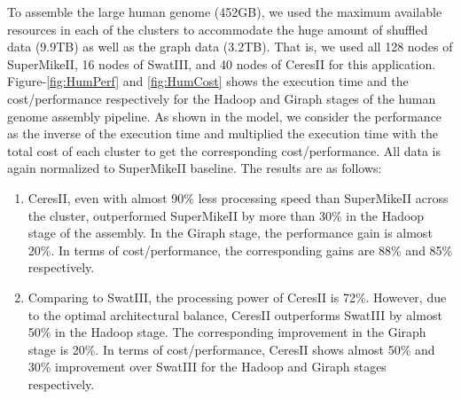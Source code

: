 \documentclass[journal]{IEEEtran}
\begin{document}
To assemble the large human genome (452GB), we used the maximum available resources in each of the clusters to accommodate the huge amount of shuffled data (9.9TB) as well as the graph data (3.2TB). That is, we used all 128 nodes of SuperMikeII, 16 nodes of SwatIII, and 40 nodes of CeresII for this application. Figure-\ref{fig:HumPerf} and \ref{fig:HumCost} shows the execution time and the cost/performance respectively for the Hadoop and Giraph stages of the human genome assembly pipeline. As shown in the model, we consider the performance as the inverse of the execution time and multiplied the execution time with the total cost of each cluster to get the corresponding cost/performance. All data is again normalized to SuperMikeII baseline. The results are as follows:
\begin{enumerate}
\item CeresII, even with almost 90\% less processing speed than SuperMikeII across the cluster, outperformed SuperMikeII by more than 30\% in the Hadoop stage of the assembly. In the Giraph stage, the performance gain is almost 20\%. In terms of cost/performance, the corresponding gains are 88\% and 85\% respectively. 
\item Comparing to SwatIII,  the processing power of CeresII is 72\%. However,  due to the optimal architectural balance, CeresII outperforms SwatIII by almost 50\% in the Hadoop stage. The corresponding improvement in the Giraph stage is 20\%. In terms of cost/performance, CeresII shows almost 50\% and 30\% improvement over SwatIII for the Hadoop and Giraph stages respectively.
\end{enumerate}

%
%
\end{document}
